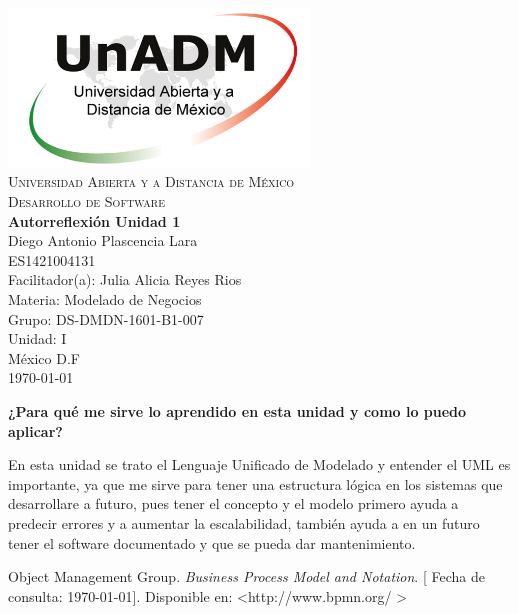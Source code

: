 \documentclass[spanish,12pt,letterpapper]{article}
\begin{document}
	\begin{titlepage}
		\begin{center}
			\includegraphics[width=0.6\textwidth]{../logoUnADM}~\\[1cm] 
			\textsc{Universidad Abierta y a Distancia de México}\\[0.8cm]
			\textsc{Desarrollo de Software}\\[1.8cm]
			
			\textbf{ \Large Autorreflexión Unidad 1}\\[3cm]
			
			Diego Antonio Plascencia Lara\\ ES1421004131 \\[0.4cm]
			Facilitador(a): Julia Alicia Reyes Rios\\
			Materia: Modelado de Negocios\\
			Grupo: DS-DMDN-1601-B1-007 \\
			Unidad: I \\
			
			\vfill México D.F\\{\today}
			
		\end{center}
	\end{titlepage}
	
	\textbf{¿Para  qué  me  sirve  lo  aprendido  en  esta  unidad  y  como  lo  puedo aplicar?\\}
	
	En esta unidad se trato el Lenguaje Unificado de Modelado y entender el UML es importante, ya que me sirve para tener una estructura lógica en los sistemas que desarrollare a futuro, pues tener el concepto y el modelo primero ayuda a predecir errores y a aumentar la escalabilidad, también ayuda a en un futuro tener el software documentado y que se pueda dar mantenimiento.
	
	
	
	
	
	\pagebreak
	\begin{thebibliography}{9}
	 Object Management Group. 
		\emph{Business Process Model and Notation}. {[} Fecha de consulta: \today {]}. Disponible en: \textless http://www.bpmn.org/ \textgreater	
	\end{thebibliography}
\end{document}
